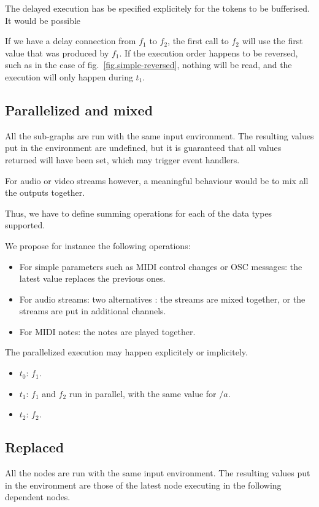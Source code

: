 \documentclass{article}
\begin{document}
    The delayed execution has be specified explicitely for the tokens to be bufferised.
    It would be possible
    
    If we have a delay connection from $f_1$ to $f_2$, the first call to $f_2$ will use the first value that was produced by $f_1$.
    If the execution order happens to be reversed, such as in the case of fig.~\ref{fig.simple-reversed}, nothing will be read, and the execution will only happen during $t_1$.
	
	\subsection{Parallelized and mixed}
	All the sub-graphs are run with the same input environment. 
	The resulting values put in the environment are undefined, but it is guaranteed that all values returned will have been set, which may trigger event handlers.
    
    For audio or video streams however, a meaningful behaviour would be to mix all the outputs together.
    
    Thus, we have to define summing operations for each of the data types supported.
    
    We propose for instance the following operations: 
    \begin{itemize}
        \item For simple parameters such as MIDI control changes or OSC messages: the latest value replaces the previous ones.
        \item For audio streams: two alternatives : the streams are mixed together, or the streams are put in additional channels.
        \item For MIDI notes: the notes are played together.
    \end{itemize}

    The parallelized execution may happen explicitely or implicitely.

    \begin{itemize}
        \item $t_0$: $f_1$.
        \item $t_1$: $f_1$ and $f_2$ run in parallel, with the same value for $/a$.
        \item $t_2$: $f_2$. 
    \end{itemize}
     
	\subsection{Replaced}
	All the nodes are run with the same input environment. 
	The resulting values put in the environment are those of the latest node executing in the following dependent nodes.
    
\end{document}
